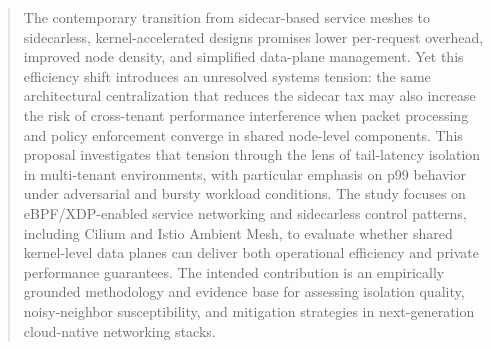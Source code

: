 \begin{abstract}
The contemporary transition from sidecar-based service meshes to sidecarless, kernel-accelerated designs promises lower per-request overhead, improved node density, and simplified data-plane management. Yet this efficiency shift introduces an unresolved systems tension: the same architectural centralization that reduces the sidecar tax may also increase the risk of cross-tenant performance interference when packet processing and policy enforcement converge in shared node-level components. This proposal investigates that tension through the lens of tail-latency isolation in multi-tenant environments, with particular emphasis on p99 behavior under adversarial and bursty workload conditions. The study focuses on eBPF/XDP-enabled service networking and sidecarless control patterns, including Cilium and Istio Ambient Mesh, to evaluate whether shared kernel-level data planes can deliver both operational efficiency and private performance guarantees. The intended contribution is an empirically grounded methodology and evidence base for assessing isolation quality, noisy-neighbor susceptibility, and mitigation strategies in next-generation cloud-native networking stacks.
\end{abstract}

